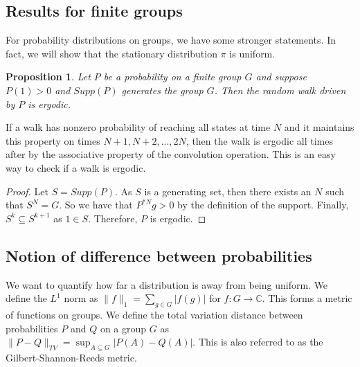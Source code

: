 \documentclass[]{article}
\newtheorem{proposition}[theorem]{Proposition}
\theoremstyle{definition}
\numberwithin{theorem}{section}
\numberwithin{equation}{section}
\begin{document}
\subsection{Results for finite groups}
For probability distributions on groups, we have some stronger statements. In fact, we will show that the stationary distribution $\pi$ is uniform.
\begin{proposition}
	Let $P$ be a probability on a finite group $G$ and suppose $P(1) > 0$ and $Supp(P)$ generates the group $G$. Then the random walk driven by $P$ is ergodic.
\end{proposition}

If a walk has nonzero probability of reaching all states at time $N$ and it maintains this property on times $N+ 1, N + 2 , ..., 2N$, then the walk is ergodic all times after by the associative property of the convolution operation. This is an easy way to check if a walk is ergodic.

\begin{proof}
	Let $S = Supp(P)$. As $S$ is a generating set, then there exists an $N$ such that $S^N = G$. So we have that $P^{\ast N} g > 0$ by the definition of the support. Finally, $S^{k} \subseteq S^{k + 1}$ as $1 \in S$. Therefore, $P$ is ergodic. 
\end{proof}


\subsection{Notion of difference between probabilities}
We want to quantify how far a distribution is away from being uniform. We define the $L^1$ norm as $\|f\|_1 = \sum_{g \in G} |f(g)|$ for $f : G \rightarrow \mathbb{C}$. This forms a metric of functions on groups. 
We define the total variation distance between probabilities $P$ and $Q$ on a group $G$ as $\| P - Q\|_{TV} = \sup_{A \subseteq G} |P(A) - Q(A)|$. This is also referred to as the Gilbert-Shannon-Reeds metric. \cite{diaconisGeneratingRandomPermutation1981} 
\end{document}

